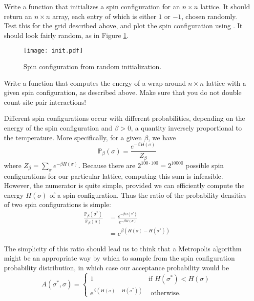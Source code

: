 \begin{problem}
Write a function that initializes a spin configuration for an $n \times n$ lattice. It should return an $n \times n$ array, each entry of which is either $1$ or $-1$, chosen randomly. Test this for the grid described above, and plot the spin configuration using . It should look fairly random, as in Figure \ref{fig:random_spin}.
\end{problem}

\begin{figure}
\centering
\texttt{[image: init.pdf]}
\caption{Spin configuration from random initialization.}
\label{fig:random_spin}
\end{figure}

\begin{problem}
Write a function that computes the energy of a wrap-around $n \times n$ lattice with a given spin configuration, as described above. Make sure that you do not double count site pair interactions!
\end{problem}

Different spin configurations occur with different probabilities, depending on the energy of the spin configuration and $\beta > 0$, a quantity inversely proportional to the temperature. More specifically, for a given $\beta$, we have
\begin{equation*}
\mathbb{P}_{\beta}(\sigma) = \frac{e^{-\beta H(\sigma)}}{Z_{\beta}}
\end{equation*}
where $Z_{\beta} = \sum_{\sigma} e^{-\beta H(\sigma)}$. Because there are $2^{100 \cdot 100} = 2^{10000}$ possible spin configurations for our particular lattice, computing this sum is infeasible. However, the numerator is quite simple, provided we can efficiently compute the energy $H(\sigma)$ of a spin configuration. Thus the ratio of the probability densities of two spin configurations is simple:
\begin{align*}
\frac{\mathbb{P}_{\beta}(\sigma^{*})}{\mathbb{P}_{\beta}(\sigma)} & = \frac{e^{-\beta H(\sigma^{*})}}{e^{-\beta H(\sigma)}} \\
& = e^{\beta (H(\sigma) - H(\sigma^{*}))}
\end{align*}

The simplicity of this ratio should lead us to think that a Metropolis algorithm might be an appropriate way by which to sample from the spin configuration probability distribution, in which case our acceptance probability would be
\begin{equation*}
A(\sigma^{*}, \sigma) = \begin{cases} 1 & \mbox{if } H(\sigma^{*}) < H(\sigma) \\ e^{\beta (H(\sigma) - H(\sigma^{*}))} & \mbox{ otherwise.} \end{cases}
\end{equation*}

